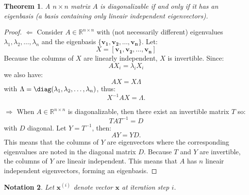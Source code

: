 \documentclass[a4paper,11pt]{report}
\newtheorem{theorem}{Theorem}[section]
\newtheorem{notation}[theorem]{Notation}
\newcommand{\R}{{\mathbb R}}
\begin{document}
\begin{theorem}\label{eigenbasis}
  A $n \times n$ matrix $A$ is diagonalizable if and only if it has an eigenbasis (a basis containing only lineair independent eigenvectors).
\end{theorem}
\begin{proof}
  $\Leftarrow$ Consider $A \in \R^{n \times n}$ with (not necessarily different) 
  eigenvalues $\lambda_1, \lambda_2, \ldots, \lambda_n$ and the eigenbasis $\{\mathbf{v_1}, \mathbf{v_2}, \ldots, 
  \mathbf{v_n}\}$. Let:
  $$X = [\mathbf{v_1},\mathbf{v_2},\ldots,\mathbf{v_n}]$$
  Because the columns of $X$ are linearly independent, $X$ is invertible. 
Since:
$$AX_i = \lambda_iX_i$$
we also have:
$$AX = X\Lambda$$
with $\Lambda = \diag(\lambda_1, \lambda_2, \ldots, \lambda_n)$, thus: 
$$X^{-1}AX= \Lambda.$$

$\Rightarrow$ When $A \in \R^{n\times n}$ is diagonalizable, then there exist an invertible matrix $T$ so:
$$TAT^{-1}=D$$
with $D$ diagonal. Let $Y = T^{-1}$, then:
$$AY = YD.$$
This means that the columns of $Y$ are eigenvectors where the corresponding 
eigenvalues are noted in the diagonal matrix $D$. Because $T$ and $Y$ are 
invertible, the columns of $Y$ are lineair independent. This means that $A$ has $n$ 
lineair independent eigenvectors, forming an eigenbasis.
\end{proof}
\begin{notation}\label{numeriekenotatie}
  Let $\mathbf{x}^{(i)}$ denote vector $\mathbf{x}$ at iteration step $i$.
\end{notation}
\end{document}
